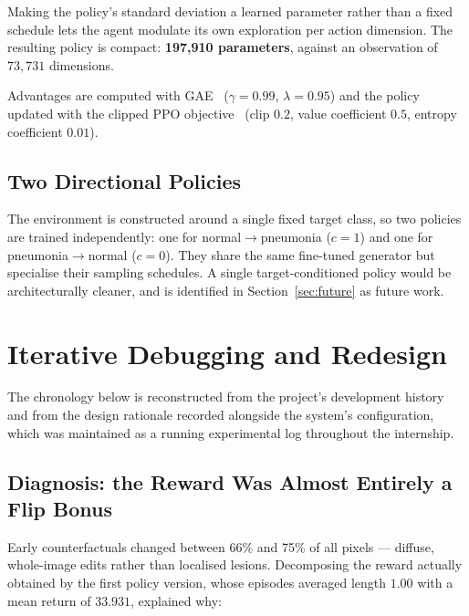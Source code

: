 Making the policy's standard deviation a learned parameter rather than a
fixed schedule lets the agent modulate its own exploration per action
dimension. The resulting policy is compact: \textbf{197{,}910
parameters}, against an observation of $73{,}731$ dimensions.

Advantages are computed with GAE~\cite{schulman2016gae}
($\gamma = 0.99$, $\lambda = 0.95$) and the policy updated with the
clipped PPO objective~\cite{schulman2017ppo} (clip $0.2$, value
coefficient $0.5$, entropy coefficient $0.01$).

\subsection{Two Directional Policies}

The environment is constructed around a single fixed target class, so two
policies are trained independently: one for normal$\rightarrow$pneumonia
($c=1$) and one for pneumonia$\rightarrow$normal ($c=0$). They share the
same fine-tuned generator but specialise their sampling schedules. A
single target-conditioned policy would be architecturally cleaner, and is
identified in Section~\ref{sec:future} as future work.

\section{Iterative Debugging and Redesign}

The chronology below is reconstructed from the project's development
history and from the design rationale recorded alongside the system's
configuration, which was maintained as a running experimental log
throughout the internship.

\subsection{Diagnosis: the Reward Was Almost Entirely a Flip Bonus}

Early counterfactuals changed between 66\% and 75\% of all pixels ---
diffuse, whole-image edits rather than localised lesions. Decomposing the
reward actually obtained by the first policy version, whose episodes
averaged length $1.00$ with a mean return of $33.931$, explained why:

